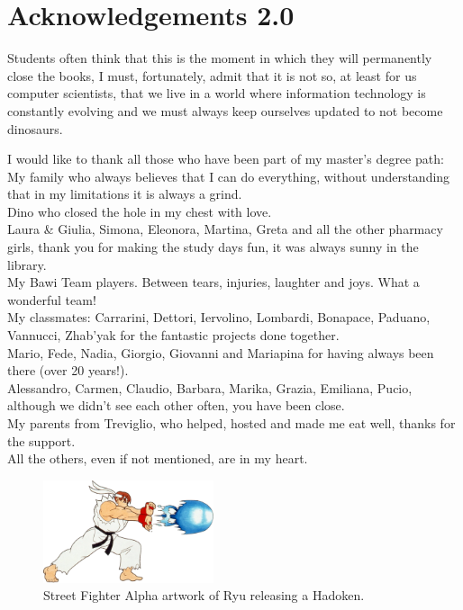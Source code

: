 \chapter*{Acknowledgements 2.0}

Students often think that this is the moment in which they will permanently close the books, I must, fortunately, admit that it is not so, at least for us computer scientists, that we live in a world where information technology is constantly evolving and we must always keep ourselves updated to not become dinosaurs.

I would like to thank all those who have been part of my master's degree path:\\
My family who always believes that I can do everything, without understanding that in my limitations it is always a grind.\\
Dino who closed the hole in my chest with love.\\
Laura \& Giulia, Simona, Eleonora, Martina, Greta and all the other pharmacy girls, thank you for making the study days fun, it was always sunny in the library.\\
My Bawi Team players. Between tears, injuries, laughter and joys. What a wonderful team!\\
My classmates: Carrarini, Dettori, Iervolino, Lombardi, Bonapace, Paduano, Vannucci, Zhab'yak for the fantastic projects done together.\\
Mario, Fede, Nadia, Giorgio, Giovanni and Mariapina for having always been there (over 20 years!).\\
Alessandro, Carmen, Claudio, Barbara, Marika, Grazia, Emiliana, Pucio, although we didn't see each other often, you have been close.\\
My parents from Treviglio, who helped, hosted and made me eat well, thanks for the support.\\
All the others, even if not mentioned, are in my heart.

\vspace*{\fill}

\begin{figure}[H]
	\centering
	\includegraphics[width=5cm]{immagini/hadoken}
	\caption{Street Fighter Alpha artwork of Ryu releasing a Hadoken.}
	\label{fig:hadoken}
\end{figure}
